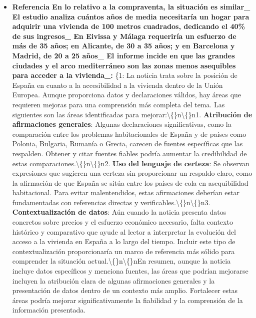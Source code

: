 \documentclass[10pt,a4paper]{article}
\begin{document}
\begin{itemize}[leftmargin=*]
            \item \textbf{Referencia En lo relativo a la compraventa, la situaci\'{o}n es similar\_ El estudio analiza cu\'{a}ntos a\~{n}os de media necesitar\'{i}a un hogar para adquirir una vivienda de 100 metros cuadrados, dedicando el 40\% de sus ingresos\_ En Eivissa y M\'{a}laga requerir\'{i}a un esfuerzo de m\'{a}s de 35 a\~{n}os; en Alicante, de 30 a 35 a\~{n}os; y en Barcelona y Madrid, de 20 a 25 a\~{n}os\_ El informe incide en que las grandes ciudades y el arco mediterr\'{a}neo son las zonas menos asequibles para acceder a la vivienda\_:} \{{}1{}: {}La noticia trata sobre la posici\'{o}n de Espa\~{n}a en cuanto a la accesibilidad a la vivienda dentro de la Uni\'{o}n Europea. Aunque proporciona datos y declaraciones v\'{a}lidos, hay \'{a}reas que requieren mejoras para una comprensi\'{o}n m\'{a}s completa del tema. Las siguientes son las \'{a}reas identificadas para mejorar:\textbackslash\{\}n\textbackslash\{\}n1. \textbf{Atribuci\'{o}n de afirmaciones generales}: Algunas declaraciones significativas, como la comparaci\'{o}n entre los problemas habitacionales de Espa\~{n}a y de pa\'{i}ses como Polonia, Bulgaria, Ruman\'{i}a o Grecia, carecen de fuentes espec\'{i}ficas que las respalden. Obtener y citar fuentes fiables podr\'{i}a aumentar la credibilidad de estas comparaciones.\textbackslash\{\}n\textbackslash\{\}n2. \textbf{Uso del lenguaje de certeza}: Se observan expresiones que sugieren una certeza sin proporcionar un respaldo claro, como la afirmaci\'{o}n de que {}Espa\~{n}a se sit\'{u}a entre los pa\'{i}ses de cola en {}asequibilidad{} habitacional{}. Para evitar malentendidos, estas afirmaciones deber\'{i}an estar fundamentadas con referencias directas y verificables.\textbackslash\{\}n\textbackslash\{\}n3. \textbf{Contextualizaci\'{o}n de datos}: A\'{u}n cuando la noticia presenta datos concretos sobre precios y el esfuerzo econ\'{o}mico necesario, falta contexto hist\'{o}rico y comparativo que ayude al lector a interpretar la evoluci\'{o}n del acceso a la vivienda en Espa\~{n}a a lo largo del tiempo. Incluir este tipo de contextualizaci\'{o}n proporcionar\'{i}a un marco de referencia m\'{a}s s\'{o}lido para comprender la situaci\'{o}n actual.\textbackslash\{\}n\textbackslash\{\}nEn resumen, aunque la noticia incluye datos espec\'{i}ficos y menciona fuentes, las \'{a}reas que podr\'{i}an mejorarse incluyen la atribuci\'{o}n clara de algunas afirmaciones generales y la presentaci\'{o}n de datos dentro de un contexto m\'{a}s amplio. Fortalecer estas \'{a}reas podr\'{i}a mejorar significativamente la fiabilidad y la comprensi\'{o}n de la informaci\'{o}n presentada.{}

\end{itemize}
\end{document}
